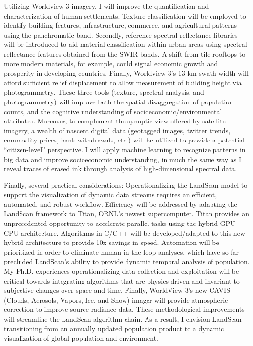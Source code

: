 \documentclass[letterpaper,sans]{moderncv}
\begin{document}
\begin{paracol}{2}
\begin{leftcolumn}
Utilizing Worldview-3 imagery, I will improve the quantification and characterization of human settlements. Texture classification will be employed to identify building features, infrastructure, commerce, and agricultural patterns using the panchromatic band. Secondly, reference spectral reflectance libraries will be introduced to aid material classification within urban areas using spectral reflectance features obtained from the SWIR bands. A shift from tile rooftops to more modern materials, for example, could signal economic growth and prosperity in developing countries. Finally, Worldview-3's 13 km swath width will afford sufficient relief displacement to allow measurement of building height via photogrammetry. These three tools (texture, spectral analysis, and photogrammetry) will improve both the spatial disaggregation of population counts, and the cognitive understanding of socioeconomic/environmental attributes.  
Moreover, to complement the synoptic view offered by satellite imagery, a wealth of nascent digital data (geotagged images, twitter trends, commodity prices, bank withdrawals, etc.) will be utilized to provide a potential ``citizen-level'' perspective. I will apply machine learning to recognize patterns in big data and improve socioeconomic understanding, in much the same way as I reveal traces of erased ink through analysis of high-dimensional spectral data. 
\vspace{.2cm}

Finally, several practical considerations: Operationalizing the LandScan model to support the visualization of dynamic data streams requires an efficient, automated, and robust workflow. Efficiency will be addressed by adapting the LandScan framework to Titan, ORNL's newest supercomputer. Titan provides an unprecedented opportunity to accelerate parallel tasks using the hybrid GPU-CPU architecture. Algorithms in C/C++ will be developed/adapted to this new hybrid architecture to provide 10x savings in speed. Automation will be prioritized in order to eliminate human-in-the-loop analyses, which have so far precluded LandScan's ability to provide dynamic temporal analysis of population. 
My Ph.D. experiences operationalizing data collection and exploitation will be critical towards integrating algorithms that are physics-driven and invariant to subjective changes over space and time. Finally, WorldView-3's new CAVIS (Clouds, Aerosols, Vapors, Ice, and Snow) imager will provide atmospheric correction to improve source radiance data. These methodological improvements will streamline the LandScan algorithm chain. As a result, I envision LandScan transitioning from an annually updated population product to a dynamic visualization of global population and environment. 
\vspace{.2cm}


\end{leftcolumn}
\end{paracol}
\end{document}

